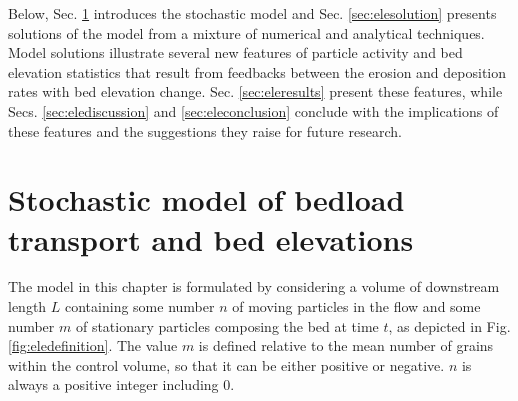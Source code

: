Below, Sec. \ref{sec:elemodel} introduces the stochastic model and Sec. \ref{sec:elesolution} presents solutions of the model from a mixture of numerical and analytical techniques. Model solutions illustrate several new features of particle activity and bed elevation statistics that result from feedbacks between the erosion and deposition rates with bed elevation change. Sec. \ref{sec:eleresults} present these features, while Secs. \ref{sec:elediscussion} and \ref{sec:eleconclusion} conclude with the implications of these features and the suggestions they raise for future research.

\section{Stochastic model of bedload transport and bed elevations}
\label{sec:elemodel}

The model in this chapter is formulated by considering a volume of downstream length $L$ containing some number $n$ of moving particles in the flow and some number $m$ of stationary particles composing the bed at time $t$, as depicted in Fig. \ref{fig:eledefinition}. The value $m$ is defined relative to the mean number of grains within the control volume, so that it can be either positive or negative. $n$ is always a positive integer including $0$.

